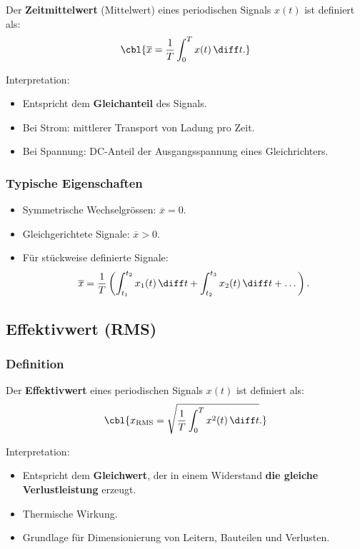 Der \textbf{Zeitmittelwert} (Mittelwert) eines periodischen Signals $x(t)$ ist definiert als:
\[
\cbl{\overline{x} = \frac{1}{T} \int_{0}^{T} x(t)\,\diff t.}
\]

Interpretation:
\begin{itemize}
    \item Entspricht dem \textbf{Gleichanteil} des Signals.
    \item Bei Strom: mittlerer Transport von Ladung pro Zeit.
    \item Bei Spannung: DC-Anteil der Ausgangsspannung eines Gleichrichters.
\end{itemize}

\subsubsection{Typische Eigenschaften}

\begin{itemize}
    \item Symmetrische Wechselgrössen: $\overline{x}=0$.
    \item Gleichgerichtete Signale: $\overline{x}>0$.
    \item Für stückweise definierte Signale:
    \[
    \overline{x} = \frac{1}{T} \left( \int_{t_1}^{t_2} x_1(t)\,\diff t + \int_{t_2}^{t_3} x_2(t)\,\diff t + \dots \right).
    \]
\end{itemize}


\subsection{Effektivwert (RMS)}

\subsubsection{Definition}

Der \textbf{Effektivwert} eines periodischen Signals $x(t)$ ist definiert als:
\[
\cbl{x_{\mathrm{RMS}} = \sqrt{\frac{1}{T} \int_{0}^{T} x^2(t)\,\diff t}.}
\]

Interpretation:
\begin{itemize}
    \item Entspricht dem \textbf{Gleichwert}, der in einem Widerstand \textbf{die gleiche Verlustleistung} erzeugt.
    \item Thermische Wirkung.
    \item Grundlage für Dimensionierung von Leitern, Bauteilen und Verlusten.
\end{itemize}

